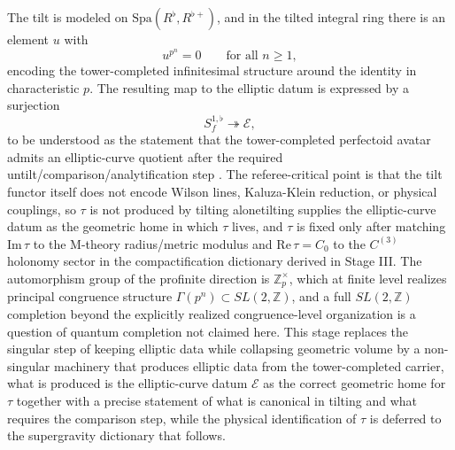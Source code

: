 \documentclass[11pt]{article}
\theoremstyle{remark}
\newcommand{\Z}{\mathbb{Z}}
\newcommand{\calE}{\mathcal{E}}
\begin{document}
The tilt is modeled on \(\mathrm{Spa}(R^{\flat},R^{\flat+})\), and in the tilted integral ring there is an element \(u\) with
\begin{equation}\label{97}
u^{p^{n}}=0\qquad \text{for all }n\ge 1,
\end{equation}
encoding the tower-completed infinitesimal structure around the identity in characteristic \(p\). The resulting map to the elliptic datum is expressed by a surjection
\begin{equation}\label{98}
S_f^{1,\flat}\twoheadrightarrow \calE,
\end{equation}
to be understood as the statement that the tower-completed perfectoid avatar admits an elliptic-curve quotient after the required untilt/comparison/analytification step \cite{Scholze2012}. The referee-critical point is that the tilt functor itself does not encode Wilson lines, Kaluza-Klein reduction, or physical couplings, so \(\tau\) is not produced by tilting alone\:tilting supplies the elliptic-curve datum as the geometric home in which \(\tau\) lives, and \(\tau\) is fixed only after matching \(\mathrm{Im}\,\tau\) to the M-theory radius/metric modulus and \(\mathrm{Re}\,\tau=C_0\) to the \(C^{(3)}\) holonomy sector in the compactification dictionary derived in Stage III. The automorphism group of the profinite direction is \(\Z_p^{\times}\), which at finite level realizes principal congruence structure \(\Gamma(p^{n})\subset SL(2,\Z)\), and a full \(SL(2,\Z)\) completion beyond the explicitly realized congruence-level organization is a question of quantum completion not claimed here. This stage replaces the singular step of keeping elliptic data while collapsing geometric volume by a non-singular machinery that produces elliptic data from the tower-completed carrier, what is produced is the elliptic-curve datum \(\calE\) as the correct geometric home for \(\tau\) together with a precise statement of what is canonical in tilting and what requires the comparison step, while the physical identification of \(\tau\) is deferred to the supergravity dictionary that follows.
\end{document}
